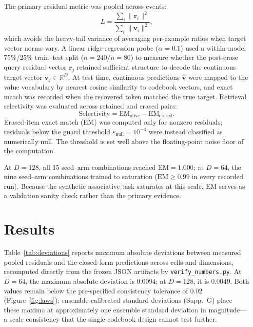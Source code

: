 \documentclass[11pt,a4paper]{article}
\newcommand{\vb}{\mathbf{v}}
\newcommand{\R}{\mathbb{R}}
\begin{document}
The primary residual metric was pooled across events:
\begin{equation}
L = \frac{\sum_i \|\mathbf{r}_i\|^2}{\sum_i \|\mathbf{v}_i\|^2},
\end{equation}
which avoids the heavy-tail variance of averaging per-example ratios when target vector norms vary. A linear ridge-regression probe ($\alpha=0.1$) used a within-model 75\%/25\% train--test split ($n=240$/$n=80$) to measure whether the post-erase query residual vector $\mathbf{r}_j$ retained sufficient structure to decode the continuous target vector $\vb_j \in \R^D$. At test time, continuous predictions $\hat{\mathbf{v}}$ were mapped to the value vocabulary by nearest cosine similarity to codebook vectors, and exact match was recorded when the recovered token matched the true target. Retrieval selectivity was evaluated across retained and erased pairs:
\begin{equation}
\text{Selectivity} = \mathrm{EM}_{\text{alive}} - \mathrm{EM}_{\text{erased}}.
\end{equation}
Erased-item exact match (EM) was computed only for nonzero residuals; residuals below the guard threshold $\varepsilon_{\text{null}} = 10^{-4}$ were instead classified as numerically null. The threshold is set well above the floating-point noise floor of the computation.

At $D=128$, all 15 seed--arm combinations reached $\mathrm{EM}=1.000$; at $D=64$, the nine seed--arm combinations trained to saturation ($\mathrm{EM} \ge 0.99$ in every recorded run). Because the synthetic associative task saturates at this scale, EM serves as a validation sanity check rather than the primary evidence.

\section{Results}\label{sec:results}

Table~\ref{tab:deviations} reports maximum absolute deviations between measured pooled residuals and the closed-form predictions across cells and dimensions, recomputed directly from the frozen JSON artifacts by \texttt{verify\_numbers.py}. At $D=64$, the maximum absolute deviation is $0.0094$; at $D=128$, it is $0.0049$. Both values remain below the pre-specified consistency tolerance of $0.02$ (Figure~\ref{fig:laws}); ensemble-calibrated standard deviations (Supp.~G) place these maxima at approximately one ensemble standard deviation in magnitude---a scale consistency that the single-codebook design cannot test further.
\end{document}
